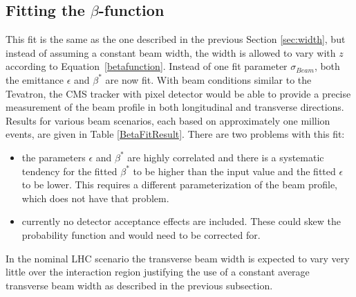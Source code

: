 \documentclass{cmspaper}
\begin{document}





\subsection{\label{sec:betafit}Fitting the $\beta$-function}

This fit is the same as the one described in the previous Section \ref{sec:width}, but instead of assuming a constant beam width, 
 the width is allowed to vary with $z$ according to Equation~\ref{betafunction}. Instead of one fit parameter $\sigma_{Beam}$, 
both the emittance $\epsilon$ and $\beta^{*}$ are now fit.
With beam conditions similar to the Tevatron, the CMS tracker with pixel detector would  be able to provide a precise measurement of the beam profile 
in both longitudinal and transverse directions.
Results for various beam scenarios, each based on approximately one million events, are given in Table \ref{BetaFitResult}. 
There are two problems with this fit:
\begin{itemize}
\item  the parameters  $\epsilon$ and $\beta^{*}$ are highly correlated 
       and there is a systematic tendency for the fitted  $\beta^{*}$ to be higher than the input value and the fitted $\epsilon$
       to be lower. This requires a different parameterization of the beam profile, which does not have that problem.
\item  currently no detector acceptance effects are included. These could skew the probability function and would need to be corrected for.  
\end{itemize}
In the nominal LHC scenario the transverse beam width is expected to vary very little over the interaction region justifying the use of
a constant average transverse beam width as described in the previous subsection.     
\end{document}
